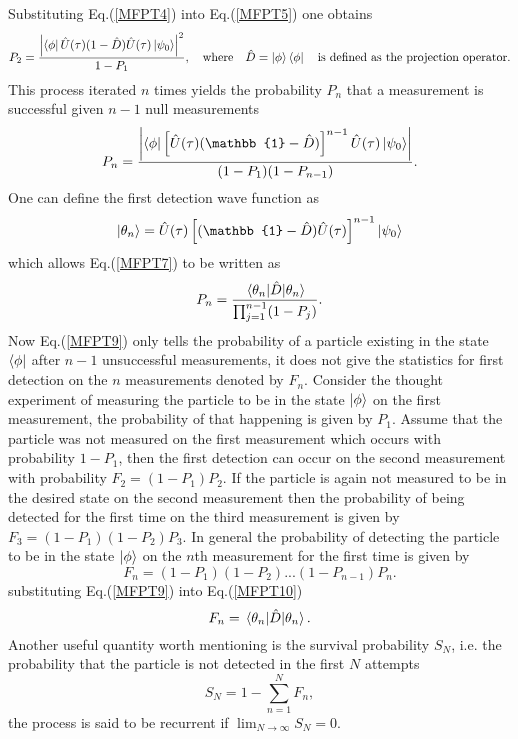 \documentclass{article}
\numberwithin{equation}{section}
\newcommand{\1}{\mathbb{1}}
\newcommand{\state}{\ket{\phi}}
\newcommand{\projection}{\bra{\phi}}
\begin{document}
Substituting Eq.(\ref{MFPT4}) into Eq.(\ref{MFPT5}) one obtains
\begin{equation}\label{MFPT6}
    P_2=\frac{\abs{\projection\hat{U}(\tau)(1-\hat{D})\hat{U}(\tau)\ket{\psi_0}}^2}{1-P_1}, \quad \text{where}\quad \hat{D}=\state\projection \quad \text{is defined as the projection operator.}
\end{equation}
This process iterated $n$ times yields the probability $P_n$ that a measurement is successful given $n-1$ null measurements
\begin{equation}\label{MFPT7}
    P_n=\frac
    {\abs
    {\projection \left[\hat{U}(\tau)(\1-\hat{D})\right]^{n-1}\hat{U}(\tau)\ket{\psi_0}}}
    {(1-P_1)(1-P_{n-1})}.
\end{equation}
One can define the first detection wave function as
\begin{equation}\label{MFPT8}
    \ket{\theta_n}=\hat{U}(\tau)\left[(\1-\hat{D})\hat{U}(\tau)\right]^{n-1}\ket{\psi_0}
\end{equation}
which allows Eq.(\ref{MFPT7}) to be written as
\begin{equation}\label{MFPT9}
    P_n=\frac
    {\ev{\hat{D}}{\theta_n}}
    {\prod_{j=1}^{n-1}(1-P_j)}.
\end{equation}
Now Eq.(\ref{MFPT9}) only tells the probability of a particle existing in the state $\projection$ after $n-1$ unsuccessful measurements, it does not give the statistics for first detection on the $n$ measurements denoted by $F_n$. Consider the thought experiment of measuring the particle to be in the state $\ket{\phi}$ on the first measurement, the probability of that happening is given by $P_1$. Assume that the particle was not measured on the first measurement which occurs with probability $1-P_1$, then the first detection can occur on the second measurement with probability $F_2=(1-P_1)P_2$. If the particle is again not measured to be in the desired state on the second measurement then the probability of being detected for the first time on the third measurement is given by $F_3=(1-P_1)(1-P_2)P_3$. In general the probability of detecting the particle to be in the state $\state$ on the $n$th measurement for the first time is given by 
\begin{equation}\label{MFPT10}
    F_n=(1-P_1)(1-P_2)...(1-P_{n-1})P_n.
\end{equation}
substituting Eq.(\ref{MFPT9}) into Eq.(\ref{MFPT10}) 
\begin{equation}\label{MFPT11}
    F_n=\ev{\hat{D}}{\theta_n}.
\end{equation}
Another useful quantity worth mentioning is the survival probability $S_N$, i.e. the probability that the particle is not detected in the first $N$ attempts
\begin{equation}\label{MFPT12}
    S_N=1-\sum_{n=1}^NF_n,
\end{equation}
the process is said to be recurrent if $\lim_{N\to\infty}S_N=0$.
\end{document}
